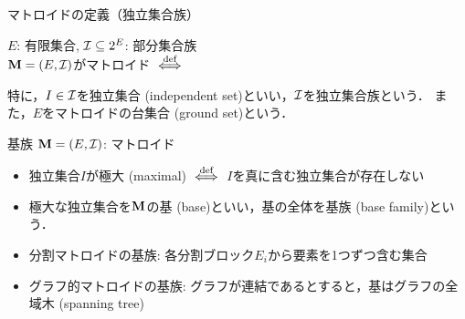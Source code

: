\documentclass[14pt,aspectratio=169,xcolor=dvipsnames,table,onlytextwidth,dvipdfmx]{beamer}
\begin{document}
\begin{frame}{マトロイドの定義（独立集合族）}
    \begin{definition}
        $E$: 有限集合, $\mathcal{I} \subseteq 2^E$: 部分集合族 \\
        $\mathbf{M} = (E, \mathcal{I})$が\alert{マトロイド} $\overset{\text{def}}{\iff}$
        \indepaxiom
    
        \bigskip
        特に，$I \in \mathcal{I}$を\alert{独立集合 (independent set)}といい，$\mathcal{I}$を\alert{独立集合族}という．
        また，$E$をマトロイドの\alert{台集合 (ground set)}という．
    \end{definition}


\end{frame}

\begin{frame}{基族}
    $\mathbf{M} = (E, \mathcal{I})$: マトロイド
    \begin{definition}
    \begin{itemize}
        \item 独立集合$I$が\alert{極大 (maximal)} $\overset{\text{def}}{\iff}$ $I$を真に含む独立集合が存在しない
        \item  極大な独立集合を$\mathbf{M}$の\alert{基 (base)}といい，基の全体を\alert{基族 (base family)}という．        
    \end{itemize}
    \end{definition}

    \bigskip
    \small
    \begin{itemize}
        \item 分割マトロイドの基族: 各分割ブロック$E_i$から要素を1つずつ含む集合
        \item グラフ的マトロイドの基族: グラフが連結であるとすると，基はグラフの\alert{全域木 (spanning tree)}
    \end{itemize}
\end{frame}
    
\end{document}
